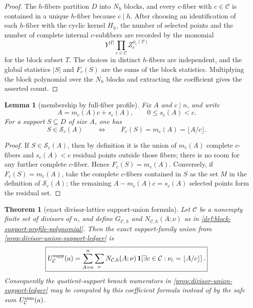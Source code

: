 \documentclass[11pt]{article}
\newtheorem{theorem}{Theorem}[section]
\newtheorem{lemma}[lemma]{Lemma}
\theoremstyle{definition}
\theoremstyle{remark}
\begin{document}
\begin{proof}
The $h$-fibers partition $D$ into $N_h$ blocks, and every $c$-fiber with
$c\in\mathcal C$ is contained in a unique $h$-fiber because $c\mid h$.  After
choosing an identification of each $h$-fiber with the cyclic kernel $H_h$, the
number of selected points and the number of complete internal $c$-subfibers are
recorded by the monomial
\[
        Y^{|T|}\prod_{c\in\mathcal C}Z_c^{\phi_c(T)}
\]
for the block subset $T$.  The choices in distinct $h$-fibers are independent,
and the global statistics $|S|$ and $F_c(S)$ are the sums of the block statistics.
Multiplying the block polynomial over the $N_h$ blocks and extracting the
coefficient gives the asserted count.
\end{proof}

\begin{lemma}[membership by full-fiber profile]
\label{lem:quotient-support-membership-profile}
Fix $A$ and $c\mid n$, and write
\[
        A=m_c(A)c+s_c(A),
        \qquad 0\le s_c(A)<c .
\]
For a support $S\subseteq D$ of size $A$, one has
\[
        S\in\mathcal S_c(A)
        \qquad\Longleftrightarrow\qquad
        F_c(S)=m_c(A)=\lfloor A/c\rfloor .
\]
\end{lemma}

\begin{proof}
If $S\in\mathcal S_c(A)$, then by definition it is the union of
$m_c(A)$ complete $c$-fibers and $s_c(A)<c$ residual points outside those fibers;
there is no room for any further complete $c$-fiber.  Hence
$F_c(S)=m_c(A)$.  Conversely, if $F_c(S)=m_c(A)$, take the complete $c$-fibers
contained in $S$ as the set $M$ in the definition of $\mathcal S_c(A)$; the
remaining $A-m_c(A)c=s_c(A)$ selected points form the residual set.
\end{proof}

\begin{theorem}[exact divisor-lattice support-union formula]
\label{thm:exact-divisor-block-support-ledger}
Let $\mathcal C$ be a nonempty finite set of divisors of $n$, and define
$G_{\mathcal C,h}$ and $N_{\mathcal C,h}(A;\nu)$ as in
\cref{def:block-support-profile-polynomial}.  Then the exact support-family
union from \cref{prop:divisor-union-support-ledger} is
\[
\boxed{
        U_{\mathcal C}^{\rm supp}(a)
        =\sum_{A=a}^{n}\sum_{\nu}
          N_{\mathcal C,h}(A;\nu)\,
          \mathbf 1\!
          \left[\exists c\in\mathcal C:
                 \nu_c=\left\lfloor A/c\right\rfloor\right].
      }
\]
Consequently the quotient-support branch numerators in
\cref{prop:divisor-union-support-ledger} may be computed by this coefficient
formula instead of by the safe sum
$U_{\mathcal C}^{\rm sum}(a)$.
\end{theorem}
\end{document}
